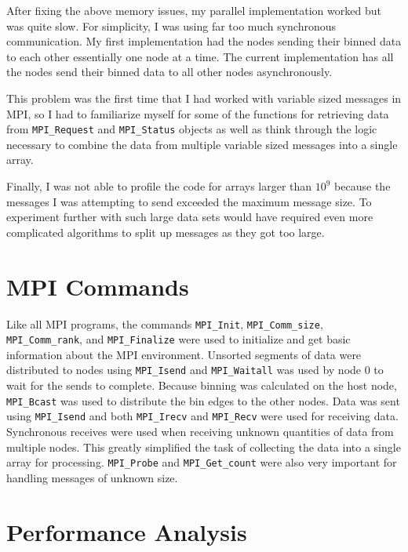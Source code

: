 \documentclass{article}
\begin{document}
After fixing the above memory issues, my parallel implementation worked but was quite slow. For simplicity, I was using far too much synchronous communication. My first implementation had the nodes sending their binned data to each other essentially one node at a time. The current implementation has all the nodes send their binned data to all other nodes asynchronously.

This problem was the first time that I had worked with variable sized messages in MPI, so I had to familiarize myself for some of the functions for retrieving data from \verb!MPI_Request! and \verb!MPI_Status! objects as well as think through the logic necessary to combine the data from multiple variable sized messages into a single array. 

Finally, I was not able to profile the code for arrays larger than \(10^9\) because the messages I was attempting to send exceeded the maximum message size. To experiment further with such large data sets would have required even more complicated algorithms to split up messages as they got too large. 

\section{MPI Commands}
Like all MPI programs, the commands \verb!MPI_Init!, \verb!MPI_Comm_size!, \verb!MPI_Comm_rank!, and \verb!MPI_Finalize! were used to initialize and get basic information about the MPI environment. Unsorted segments of data were distributed to nodes using \verb!MPI_Isend! and \verb!MPI_Waitall! was used by node 0 to wait for the sends to complete. Because binning was calculated on the host node, \verb!MPI_Bcast! was used to distribute the bin edges to the other nodes. Data was sent using \verb!MPI_Isend! and both \verb!MPI_Irecv! and \verb!MPI_Recv! were used for receiving data. Synchronous receives were used when receiving unknown quantities of data from multiple nodes. This greatly simplified the task of collecting the data into a single array for processing. \verb!MPI_Probe! and \verb!MPI_Get_count! were also very important for handling messages of unknown size.

\section{Performance Analysis}
\end{document}
